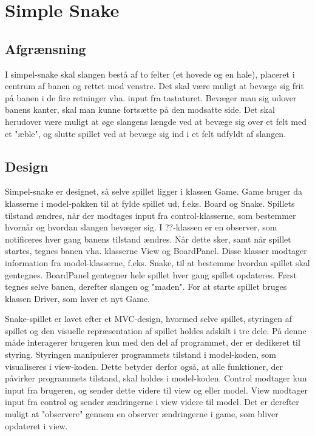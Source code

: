 \documentclass{report}
\begin{document}
\chapter{Simple Snake}
\section{Afgrænsning}
I simpel-snake skal slangen bestå af to felter (et hovede og en hale), placeret i centrum af banen og rettet mod venstre. Det skal være muligt at bevæge sig frit på banen i de fire retninger vha. input fra tastaturet. Bevæger man sig udover banens kanter, skal man kunne fortsætte på den modsatte side. Det skal herudover være muligt  at øge slangens længde ved at bevæge sig over et felt med et "æble", og slutte spillet ved at bevæge sig ind i et felt udfyldt af slangen.
\linebreak

\section{Design}
Simpel-snake er designet, så selve spillet ligger i klassen Game. Game bruger da klasserne i model-pakken til at fylde spillet ud, f.eks. Board og Snake. Spillets tilstand ændres, når der modtages input fra control-klasserne, som bestemmer hvornår og hvordan slangen bevæger sig. I ??-klassen er en observer, som notificeres hver gang banens tilstand ændres. Når dette sker, samt når spillet startes, tegnes banen vha. klasserne View og BoardPanel. Disse klasser modtager information fra model-klasserne, f.eks. Snake, til at bestemme hvordan spillet skal gentegnes. BoardPanel gentegner hele spillet hver gang spillet opdateres. Først tegnes selve banen, derefter slangen og "maden". 
For at starte spillet bruges klassen Driver, som laver et nyt Game.
\linebreak

Snake-spillet er lavet efter et MVC-design, hvormed selve spillet, styringen af spillet og den visuelle repræsentation af spillet holdes adskilt i tre dele. På denne måde interagerer brugeren kun med den del af programmet, der er dedikeret til styring. Styringen manipulerer programmets tilstand i model-koden, som visualiseres i view-koden. Dette betyder derfor også, at alle funktioner, der påvirker programmets tilstand, skal holdes i model-koden. Control modtager kun input fra brugeren, og sender dette videre til view og eller model. View modtager input fra control og sender ændringerne i view videre til model. Det er derefter muligt at "observere" gennem en observer ændringerne i game, som bliver opdateret i view. 
\end{document}
